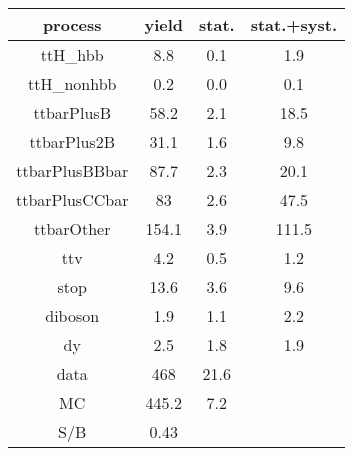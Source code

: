 \begin{tabular}{cccc}
\hline
    process     &  yield  &  stat.  &  stat.+syst.  \\
\hline
    ttH\_hbb     &   8.8   &   0.1   &      1.9      \\
   ttH\_nonhbb   &   0.2   &   0.0   &      0.1      \\
   ttbarPlusB   &  58.2   &   2.1   &     18.5      \\
  ttbarPlus2B   &  31.1   &   1.6   &      9.8      \\
 ttbarPlusBBbar &  87.7   &   2.3   &     20.1      \\
 ttbarPlusCCbar &   83    &   2.6   &     47.5      \\
   ttbarOther   &  154.1  &   3.9   &     111.5     \\
      ttv       &   4.2   &   0.5   &      1.2      \\
      stop      &  13.6   &   3.6   &      9.6      \\
    diboson     &   1.9   &   1.1   &      2.2      \\
       dy       &   2.5   &   1.8   &      1.9      \\
      data      &   468   &  21.6   &               \\
       MC       &  445.2  &   7.2   &               \\
      S/B       &  0.43   &         &               \\
\hline
\end{tabular}